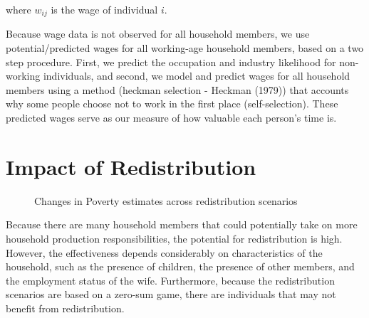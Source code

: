 \documentclass[
  11pt,
]{article}
\begin{document}
where \(w_{ij}\) is the wage of individual \(i\).

Because wage data is not observed for all household members, we use
potential/predicted wages for all working-age household members, based
on a two step procedure. First, we predict the occupation and industry
likelihood for non-working individuals, and second, we model and predict
wages for all household members using a method (heckman selection -
Heckman (1979)) that accounts why some people choose not to work in the
first place (self-selection). These predicted wages serve as our measure
of how valuable each person's time is.

\section{Impact of Redistribution}\label{impact-of-redistribution}

\begin{figure}[H]


\caption{\label{fig-limtip1}Changes in Poverty estimates across
redistribution scenarios}

\end{figure}%

Because there are many household members that could potentially take on
more household production responsibilities, the potential for
redistribution is high. However, the effectiveness depends considerably
on characteristics of the household, such as the presence of children,
the presence of other members, and the employment status of the wife.
Furthermore, because the redistribution scenarios are based on a
zero-sum game, there are individuals that may not benefit from
redistribution.
\end{document}

